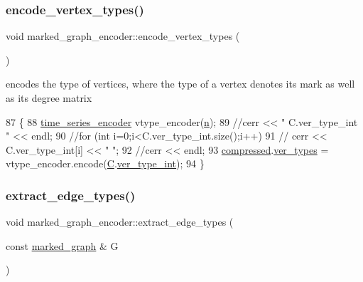 \subsubsection{\texorpdfstring{encode\+\_\+vertex\+\_\+types()}{encode\_vertex\_types()}}
{\footnotesize\ttfamily void marked\+\_\+graph\+\_\+encoder\+::encode\+\_\+vertex\+\_\+types (\begin{DoxyParamCaption}{ }\end{DoxyParamCaption})\hspace{0.3cm}{\ttfamily [private]}}



encodes the type of vertices, where the type of a vertex denotes its mark as well as its degree matrix 


\begin{DoxyCode}
87 \{
88   \hyperlink{classtime__series__encoder}{time\_series\_encoder} vtype\_encoder(\hyperlink{classmarked__graph__encoder_a4c66d9fdbc14c97523715aac7e4511cb}{n});
89   \textcolor{comment}{//cerr << " C.ver\_type\_int " << endl;}
90   \textcolor{comment}{//for (int i=0;i<C.ver\_type\_int.size();i++)}
91   \textcolor{comment}{//  cerr << C.ver\_type\_int[i] << " ";}
92   \textcolor{comment}{//cerr << endl;}
93   \hyperlink{classmarked__graph__encoder_ac2ded200860fdd2321f86dd76b28bcb3}{compressed}.\hyperlink{classmarked__graph__compressed_af446cc5e23c241a92b76642fd5ebc403}{ver\_types} = vtype\_encoder.encode(\hyperlink{classmarked__graph__encoder_af82bc0653414091291cb75553a407bdb}{C}.\hyperlink{classcolored__graph_a491ed2ea1a65118af02ec606c8d44c0a}{ver\_type\_int});
94 \}
\end{DoxyCode}
\mbox{\label{classmarked__graph__encoder_ac3060e8f7e6abbe371c5968eb47cb8a1}} 
\subsubsection{\texorpdfstring{extract\+\_\+edge\+\_\+types()}{extract\_edge\_types()}}
{\footnotesize\ttfamily void marked\+\_\+graph\+\_\+encoder\+::extract\+\_\+edge\+\_\+types (\begin{DoxyParamCaption}\item[{const \hyperlink{classmarked__graph}{marked\+\_\+graph} \&}]{G }\end{DoxyParamCaption})\hspace{0.3cm}{\ttfamily [private]}}



